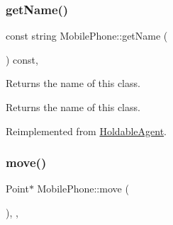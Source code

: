 \subsubsection{\texorpdfstring{get\+Name()}{getName()}}
{\footnotesize\ttfamily const string Mobile\+Phone\+::get\+Name (\begin{DoxyParamCaption}{ }\end{DoxyParamCaption}) const\hspace{0.3cm}{\ttfamily [override]}, {\ttfamily [virtual]}}

Returns the name of this class. \begin{DoxyReturn}{Returns}
the name of this class. 
\end{DoxyReturn}


Reimplemented from \hyperlink{class_holdable_agent_ab330bb40de51a957ef8826af629f94a2}{Holdable\+Agent}.

\mbox{\label{class_mobile_phone_a785d0cac08252386603c702ad8f38c5b}} 
\subsubsection{\texorpdfstring{move()}{move()}}
{\footnotesize\ttfamily Point$\ast$ Mobile\+Phone\+::move (\begin{DoxyParamCaption}{ }\end{DoxyParamCaption})\hspace{0.3cm}{\ttfamily [inline]}, {\ttfamily [override]}, {\ttfamily [virtual]}}

